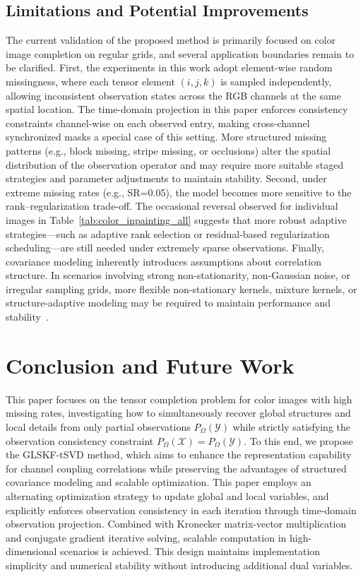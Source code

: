 \documentclass[a4paper,12pt]{article}
\numberwithin{equation}{section}
\numberwithin{algorithm}{section}
\theoremstyle{remark}
\theoremstyle{definition}
\begin{document}
\subsection{Limitations and Potential Improvements}  
The current validation of the proposed method is primarily focused on color image completion on regular grids, and several application boundaries remain to be clarified. First, the experiments in this work adopt element-wise random missingness, where each tensor element \((i,j,k)\) is sampled independently, allowing inconsistent observation states across the RGB channels at the same spatial location. The time-domain projection in this paper enforces consistency constraints channel-wise on each observed entry, making cross-channel synchronized masks a special case of this setting. More structured missing patterns (e.g., block missing, stripe missing, or occlusions) alter the spatial distribution of the observation operator and may require more suitable staged strategies and parameter adjustments to maintain stability. Second, under extreme missing rates (e.g., SR=0.05), the model becomes more sensitive to the rank–regularization trade-off. The occasional reversal observed for individual images in Table~\ref{tab:color_inpainting_all} suggests that more robust adaptive strategies—such as adaptive rank selection or residual-based regularization scheduling—are still needed under extremely sparse observations. Finally, covariance modeling inherently introduces assumptions about correlation structure. In scenarios involving strong non-stationarity, non-Gaussian noise, or irregular sampling grids, more flexible non-stationary kernels, mixture kernels, or structure-adaptive modeling may be required to maintain performance and stability~\cite{rasmussen2006gpml}.


\section{Conclusion and Future Work}

This paper focuses on the tensor completion problem for color images with high missing rates, investigating how to simultaneously recover global structures and local details from only partial observations $P_{\Omega}(\mathcal{Y})$ while strictly satisfying the observation consistency constraint $P_{\Omega}(\mathcal{X}) = P_{\Omega}(\mathcal{Y})$. To this end, we propose the GLSKF-tSVD method, which aims to enhance the representation capability for channel coupling correlations while preserving the advantages of structured covariance modeling and scalable optimization.
This paper employs an alternating optimization strategy to update global and local variables, and explicitly enforces observation consistency in each iteration through time-domain observation projection. Combined with Kronecker matrix-vector multiplication and conjugate gradient iterative solving, scalable computation in high-dimensional scenarios is achieved. This design maintains implementation simplicity and numerical stability without introducing additional dual variables.
\end{document}
